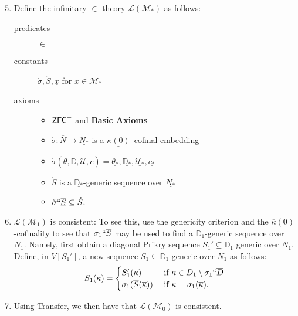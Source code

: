 \documentclass[utf8x,xcolor=svgnames,8pt]{beamer}
\newcommand{\M}{\mathcal{M}}
\newcommand{\D}{\mathbb{D}}
\newcommand{\N}{{\overline{N}}}
\renewcommand{\U}{\mathcal{U}}
\newcommand{\ZFC}{\textup{\ensuremath{\textsf{ZFC}}}}
\newcommand{\To}{\longrightarrow}
\begin{document}
\begin{frame}
\begin{enumerate} \setcounter{enumi}{4}
	\item Define the infinitary $\in$-theory $\mathcal L(\mathcal M_*)$ as follows: \begin{description}
	\item[predicates] $\in$ 
	\item[constants] $\mathring{\sigma}, \mathring S, \underline x$ for $x \in \mathcal M_*$
	\item[axioms] \begin{itemize} \item $\ZFC^-$ and \textbf{Basic Axioms}
		\item $\mathring \sigma : \underline \N \To \underline{N_*}$ is a $\underline{\overline \kappa(0)}$--cofinal embedding
		\item $\mathring{\sigma}(\overline{\underline{\theta}}, \overline{\underline{\D}}, \overline{\underline{\U}}, \overline{\underline c})=\underline{\theta_*}, \underline{\D_*}, \underline{\U_*}, \underline{c_*}$
		\item $\mathring S$ is a $\underline{\D_*}$-generic sequence over $\underline{N_*}$
		\item $\mathring \sigma ``\overline{\underline S} \subseteq \mathring S$.
	\end{itemize}
\end{description} 
	\item $\mathcal L(\M_1)$ is consistent: To see this, use the genericity criterion and the $\overline{\kappa}(0)$-cofinality to see that $\sigma_1``\overline S$ may be used to find a $\D_1$-generic sequence over $N_1$. Namely, first obtain a diagonal Prikry sequence $S_1' \subseteq \D_1$ generic over $N_1$. Define, in $V[S_1']$, a new sequence $S_1 \subseteq \D_1$ generic over $N_1$ as follows:
$$S_1(\kappa) = \begin{cases} S_1'(\kappa) &\text{ if } \kappa \in D_1 \setminus \sigma_1``\overline D \\
					\sigma_1(\overline S(\overline \kappa)) &\text{ if } \kappa = \sigma_1(\overline \kappa). \end{cases}$$ 
	\item Using Transfer, we then have that $\mathcal L(\M_0)$ is consistent.						
	\end{enumerate}
\end{frame}
\end{document}
